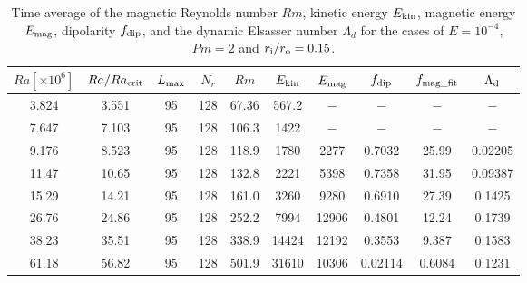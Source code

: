 \begin{table}
\begin{center}
\caption{Time average of the magnetic Reynolds number $Rm$, kinetic energy $E_{\rm kin}$, magnetic energy $E_{\rm mag}$, dipolarity $f_{\rm dip}$, and the dynamic Elsasser number $\Lambda_{d}$ for the cases of $E = 10^{-4}$, $Pm = 2$ and $r_{\rm i}/r_{\rm o} = 0.15$.}
\label{table:Summary_415}
%
\begin{tabular}{cccccccccc}
    \hline
     $Ra[\times 10^6]$  &  $Ra/Ra_{\rm crit}$& 
     $L_{\rm max}$ & $N_{r}$ & $Rm$ 
     & $E_{\rm kin}$  &  $E_{\rm mag}$ & $f_{\rm dip}$ & $f_{\rm mag\_fit}$ & $\Lambda_{\rm d}$\\
    \hline
      3.824 & 3.551 & 95 & 128 & 67.36 & 567.2 & $-$ & $-$ & $-$ & $-$ \\
      7.647 & 7.103 & 95 & 128 & 106.3 & 1422 & $-$ & $-$ & $-$ & $-$ \\
      9.176 & 8.523 & 95 & 128 & 118.9 & 1780 & 2277 & 0.7032 & 25.99 & 0.02205 \\
      11.47 & 10.65 & 95 & 128 & 132.8 & 2221 & 5398 & 0.7358 & 31.95 & 0.09387 \\
      15.29 & 14.21 & 95 & 128 & 161.0 & 3260 & 9280 & 0.6910 & 27.39 & 0.1425 \\
      26.76 & 24.86 & 95 & 128 & 252.2 & 7994 & 12906 & 0.4801 & 12.24 & 0.1739 \\
      38.23 & 35.51 & 95 & 128 & 338.9 & 14424 & 12192 & 0.3553 & 9.387 & 0.1583 \\
      61.18 & 56.82 & 95 & 128 & 501.9 & 31610 & 10306 & 0.02114 & 0.6084 & 0.1231 \\
   \hline
  \end{tabular}
\end{center}
\end{table}